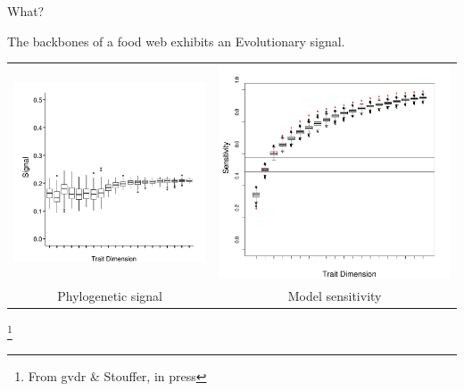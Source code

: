 \documentclass[]{beamer}
\begin{document}
\begin{frame}{What?}

\centering
The backbones of a food web exhibits an Evolutionary signal.

\centering
\begin{tabular}{cc}
\includegraphics[width=0.47\linewidth]{images/psig.pdf} & \includegraphics[width=0.47 \linewidth]{images/sens.pdf}\\
{\tiny Phylogenetic signal} & {\tiny Model sensitivity}
\end{tabular}

\footnote{From gvdr \& Stouffer, in press}

\end{frame}
\end{document}
